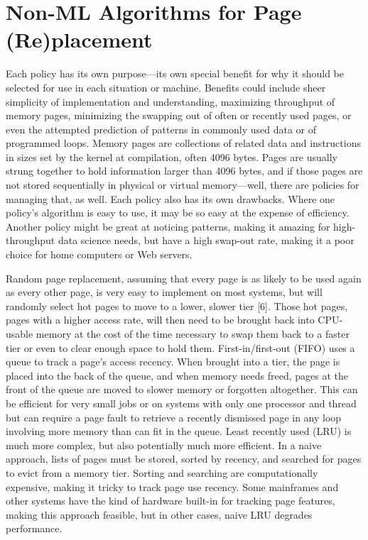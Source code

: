 \documentclass[conference]{IEEEtran}
\begin{document}
\section{Non-ML Algorithms for Page (Re)placement}
Each policy has its own purpose—its own special benefit for why it should be selected for use in each situation or machine.  Benefits could include sheer simplicity of implementation and understanding, maximizing throughput of memory pages, minimizing the swapping out of often or recently used pages, or even the attempted prediction of patterns in commonly used data or of programmed loops.  Memory pages are collections of related data and instructions in sizes set by the kernel at compilation, often 4096 bytes.  Pages are usually strung together to hold information larger than 4096 bytes, and if those pages are not stored sequentially in physical or virtual memory—well, there are policies for managing that, as well.  Each policy also has its own drawbacks.  Where one policy’s algorithm is easy to use, it may be so easy at the expense of efficiency.  Another policy might be great at noticing patterns, making it amazing for high-throughput data science needs, but have a high swap-out rate, making it a poor choice for home computers or Web servers. 

Random page replacement, assuming that every page is as likely to be used again as every other page, is very easy to implement on most systems, but will randomly select hot pages to move to a lower, slower tier [6].  Those hot pages, pages with a higher access rate, will then need to be brought back into CPU-usable memory at the cost of the time necessary to swap them back to a faster tier or even to clear enough space to hold them.  First-in/first-out (FIFO) uses a queue to track a page’s access recency.  When brought into a tier, the page is placed into the back of the queue, and when memory needs freed, pages at the front of the queue are moved to slower memory or forgotten altogether.  This can be efficient for very small jobs or on systems with only one processor and thread but can require a page fault to retrieve a recently dismissed page in any loop involving more memory than can fit in the queue.  Least recently used (LRU) is much more complex, but also potentially much more efficient.  In a naive approach, lists of pages must be stored, sorted by recency, and searched for pages to evict from a memory tier.  Sorting and searching are computationally expensive, making it tricky to track page use recency.  Some mainframes and other systems have the kind of hardware built-in for tracking page features, making this approach feasible, but in other cases, naive LRU degrades performance. 
\end{document}
